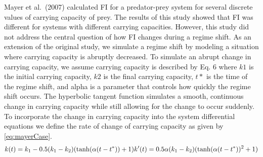 \documentclass[12pt,twoside,openany]{reedthesis}
\begin{document}
Mayer et al.~(2007) calculated FI for a predator-prey system for several discrete values of carrying capacity of prey. The results of this study showed that FI was different for systems with different carrying capacities. However, this study did not address the central question of how FI changes during a regime shift. As an extension of the original study, we simulate a regime shift by modeling a situation where carrying capacity is abruptly decreased. To simulate an abrupt change in carrying capacity, we assume carrying capacity is described by Eq. 6 where \(k1\) is the initial carrying capacity, \(k2\) is the final carrying capacity, \(t*\) is the time of the regime shift, and alpha is a parameter that controls how quickly the regime shift occurs. The hyperbolic tangent function simulates a smooth, continuous change in carrying capacity while still allowing for the change to occur suddenly. To incorporate the change in carrying capacity into the system differential equations we define the rate of change of carrying capacity as given by \eqref{eq:mayerCase}.\\
\begin{equation}  
  k(t) = k_1  - 0.5(k_1-k_2)(\tanh(\alpha (t-t^*))+1)     \\
  k'(t) = 0.5\alpha (k_1-k_2)(\tanh(\alpha(t-t^*))^2 +1)      \\ 
\label{eq:mayerCase}
\end{equation}
\end{document}
